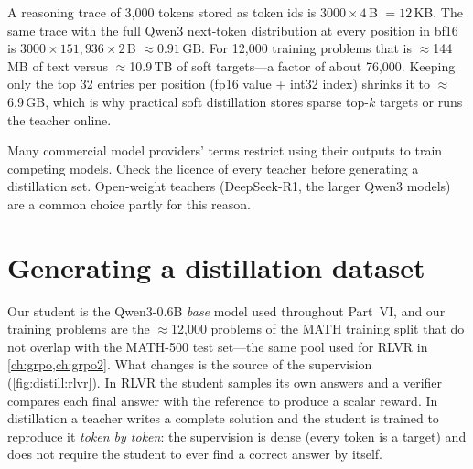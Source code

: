 \begin{napkinmath}
A reasoning trace of 3{,}000 tokens stored as token ids is $3000\times 4$\,B $=12$\,KB. The
same trace with the full Qwen3 next-token distribution at every position in bf16 is
$3000 \times 151{,}936 \times 2$\,B $\approx 0.91$\,GB. For 12{,}000 training problems that is
$\approx$144\,MB of text versus $\approx$10.9\,TB of soft targets---a factor of about 76{,}000.
Keeping only the top 32 entries per position (fp16 value + int32 index) shrinks it to
$\approx$6.9\,GB, which is why practical soft distillation stores sparse top-$k$ targets or
runs the teacher online.
\end{napkinmath}

\begin{pitfall}
Many commercial model providers' terms restrict using their outputs to train competing
models. Check the licence of every teacher before generating a distillation set. Open-weight
teachers (DeepSeek-R1, the larger Qwen3 models) are a common choice partly for this reason.
\end{pitfall}

\section{Generating a distillation dataset}\label{sec:distill:generate}

Our student is the Qwen3-0.6B \emph{base} model used throughout Part~VI, and our training
problems are the $\approx$12{,}000 problems of the MATH training split that do not overlap with
the MATH-500 test set---the same pool used for RLVR in \cref{ch:grpo,ch:grpo2}. What changes
is the source of the supervision (\cref{fig:distill:rlvr}). In RLVR the student samples its
own answers and a verifier compares each final answer with the reference to produce a scalar
reward. In distillation a teacher writes a complete solution and the student is trained to
reproduce it \emph{token by token}: the supervision is dense (every token is a target) and
does not require the student to ever find a correct answer by itself.

